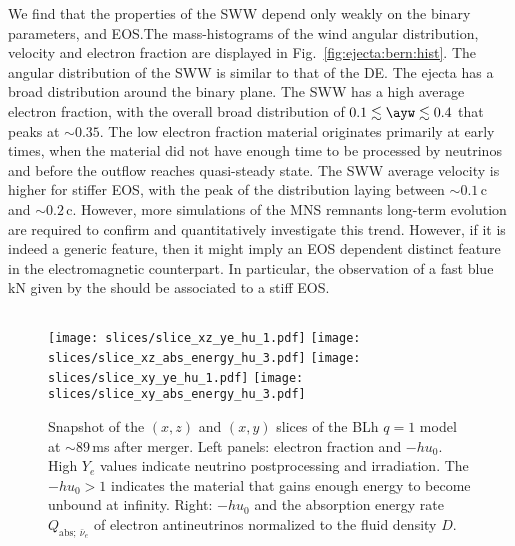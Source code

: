 We find that the properties of the \ac{SWW} depend only weakly on the binary parameters,
\mr{} and \ac{EOS}.The mass-histograms of the wind angular distribution, velocity and 
electron fraction are displayed in Fig.~\ref{fig:ejecta:bern:hist}. 
The angular distribution of the \ac{SWW} is similar to that of the \ac{DE}. The ejecta 
has a broad distribution around the binary plane.
The \ac{SWW} has a high average electron fraction, with the overall 
broad distribution of $0.1\lesssim \ayw\lesssim0.4$ that peaks at ${\sim}0.35$.
The low electron fraction material originates primarily at early times, when the 
material did not have enough time to be processed by neutrinos and before the 
outflow reaches quasi-steady state.
The \ac{SWW} average velocity is higher for stiffer \ac{EOS}, with the peak 
of the distribution laying between ${\sim}0.1\,$c and ${\sim}0.2\,$c.
However, more simulations of the \ac{MNS} remnants long-term evolution are 
required to confirm and quantitatively investigate this trend.
However, if it is indeed a generic feature, then it might imply 
an EOS dependent distinct feature in the electromagnetic counterpart. 
In particular, the observation of a fast blue kN given by the \swind{}
should be associated to a stiff EOS.



\subsection{\nwind{}}

\begin{figure*}[t]
    \centering 
    \texttt{[image: slices/slice\_xz\_ye\_hu\_1.pdf]}
    \texttt{[image: slices/slice\_xz\_abs\_energy\_hu\_3.pdf]}
    \texttt{[image: slices/slice\_xy\_ye\_hu\_1.pdf]}
    \texttt{[image: slices/slice\_xy\_abs\_energy\_hu\_3.pdf]}
    \caption{Snapshot of the $(x,z)$ and $(x,y)$ slices of the BLh $q=1$ model at 
        ${\sim}89\,$ms after merger. Left panels: electron fraction and
        $-hu_0$. High $Y_e$ values indicate neutrino
        postprocessing and irradiation. The $-hu_0>1$ indicates the
        material that gains enough energy to become unbound at
        infinity. 
        Right: $-hu_0$ and the absorption energy rate $Q_{\text{abs};\:\bar{\nu}_e}$ 
        of electron antineutrinos normalized to the fluid density $D$.
    }
    \label{fig:slice:heating_hu}
\end{figure*}

